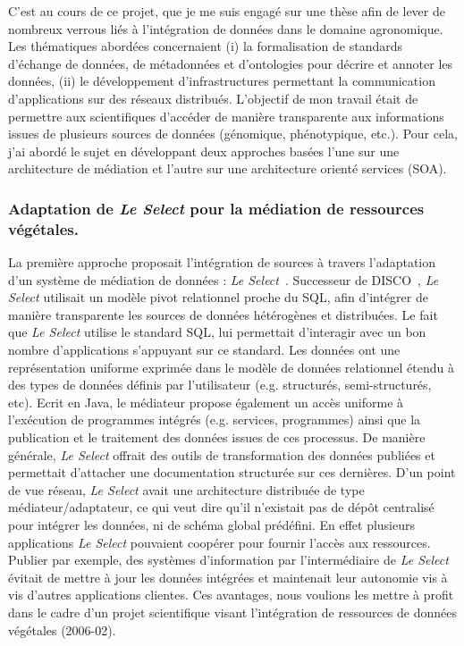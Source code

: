 C'est au cours de ce projet, que je me suis engagé sur une thèse afin de lever de nombreux verrous liés à l’intégration de données dans le domaine agronomique. Les thématiques abordées concernaient (i) la formalisation de standards d’échange de données, de métadonnées et d’ontologies pour décrire et annoter les données, (ii) le développement d’infrastructures permettant la communication d’applications sur des réseaux distribués. L’objectif de mon travail était de permettre aux scientifiques d'accéder de manière transparente aux informations issues de plusieurs sources de données (génomique, phénotypique, etc.).  Pour cela, j’ai abordé le sujet en développant deux approches basées l'une sur une architecture de médiation et l'autre sur une architecture orienté services (SOA).  

\subsubsection*{Adaptation de \textit{Le Select} pour la médiation de ressources végétales.} 

La première approche proposait l'intégration de sources à travers l'adaptation d'un système de médiation de données : \textit{Le Select}~\cite{manolescu2002}. Successeur de DISCO~\cite{Tomasic1998}, \textit{Le Select} utilisait un modèle pivot relationnel proche du SQL, afin d’intégrer de manière transparente les sources de données hétérogènes et distribuées. Le fait que \textit{Le Select} utilise le standard SQL, lui permettait d’interagir avec un bon nombre d’applications s’appuyant sur ce standard.
Les données ont une représentation uniforme exprimée dans le modèle de données relationnel étendu à des types de données définis par l'utilisateur (e.g. structurés, semi-structurés, etc). Ecrit en Java, le médiateur propose également un accès uniforme à l’exécution de programmes intégrés (e.g. services, programmes) ainsi que la publication et le traitement des données issues de ces processus. De manière générale, \textit{Le Select} offrait des outils de transformation des données publiées et permettait d’attacher une documentation structurée sur ces dernières. D’un point de vue réseau, \textit{Le Select} avait une architecture distribuée de type médiateur/adaptateur, ce qui veut dire qu’il n’existait pas de dépôt centralisé pour intégrer les données, ni de schéma global prédéfini. En effet plusieurs applications \textit{Le Select} pouvaient coopérer pour fournir l'accès aux ressources. Publier par exemple, des systèmes d’information par l’intermédiaire de \textit{Le Select} évitait de mettre à jour les données intégrées et maintenait leur autonomie vis à vis d’autres applications clientes. Ces avantages, nous voulions les mettre à profit dans le cadre d’un projet scientifique visant l’intégration de ressources de données végétales (2006-02).\\

